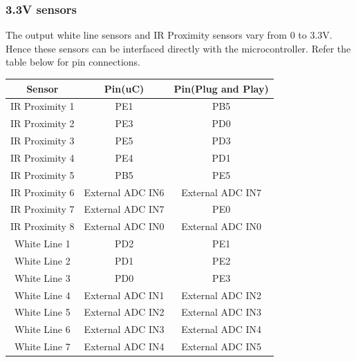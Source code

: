 \documentclass[a4paper,10pt,oneside]{article}
\begin{document}
{		\subsubsection{\textbf{3.3V sensors}}
		{The output white line sensors and IR Proximity sensors vary from 0  to 3.3V. Hence these sensors can be interfaced directly with the microcontroller. Refer the table below for pin connections.\\
		\begin{center}
		\begin{tabular}{|c|c|c|}\hline
			Sensor&		Pin(uC)	&	Pin(Plug and Play)\\
			\hline
		IR Proximity 1	& PE1	&	PB5\\
		\hline
		IR Proximity 2	& PE3	&	PD0\\
		\hline
		IR Proximity 3	& PE5	&	PD3\\
		\hline
		IR Proximity 4	& PE4	&	PD1\\
		\hline
		IR Proximity 5	& PB5	&	PE5\\		
		\hline
		IR Proximity 6	&External ADC IN6&External ADC IN7\\
		\hline
		IR Proximity 7	&External ADC IN7&PE0\\
		\hline
		IR Proximity 8	&External ADC IN0&External ADC IN0\\
		\hline
		White Line 1	&PD2			&PE1\\
		\hline
		White Line 2	&PD1			&PE2\\
		\hline
		White Line 3	&PD0			&PE3\\
		\hline
		White Line 4	&External ADC IN1&External ADC IN2\\
		\hline
		White Line 5	&External ADC IN2&External ADC IN3\\
		\hline
		White Line 6	&External ADC IN3&External ADC IN4\\
		\hline
		White Line 7	&External ADC IN4&External ADC IN5\\
		\hline
	\end{tabular}
	\\	
	\end{center}
	}
}
\end{document}

